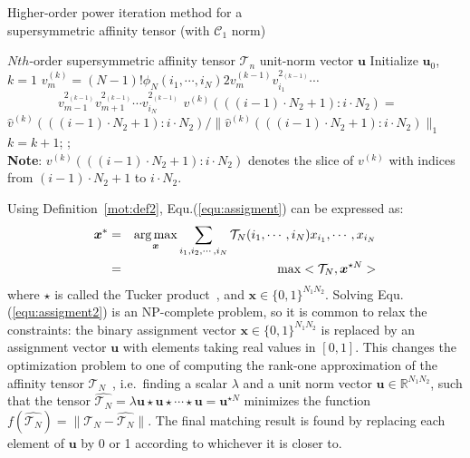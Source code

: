 \begin{algorithm}[!t]
\caption{\small Higher-order power iteration method for a \protect\\
         \mbox{}\hspace{15ex}\small supersymmetric affinity tensor (with $\mathcal{C}_1$ norm)}
\label{alg2}
\begin{algorithmic}[1]
\REQUIRE \small $Nth$-order supersymmetric affinity tensor $\mathcal{T}_n$
\ENSURE  \small unit-norm vector $\boldsymbol{u}$
\STATE   \small \; Initialize $\boldsymbol{u}_0$, $k=1$
\REPEAT
        \STATE $v_{m}^{(k)}=(N-1)!\phi_N(i_1,\cdots , i_N) 2v_{m}^{(k-1)}v_{i_1}^{2_{(k-1)}}\cdots$ \\
                 $\qquad \qquad v_{m-1}^{2_{(k-1)}}v_{m+1}^{2_{(k-1)}}\cdots v_{i_N}^{2_{(k-1)}}$
        \ENDFOR
        \STATE $v^{(k)}(((i-1)\cdot N_2+1) : i\cdot N_2)=$   \protect\\
               $\hat{v}^{(k)}(((i-1)\cdot N_2+1) : i\cdot N_2)/\lVert \hat{v}^{(k)}(((i-1)\cdot N_2+1):i\cdot N_2)\lVert_1$
        \ENDFOR
    \ENDFOR
    \STATE $k=k+1$;
;\protect\\
       \small \textbf{Note}: $v^{(k)}(((i-1)\cdot N_2+1) : i\cdot N_2)$ denotes the slice of $v^{(k)}$ with
       \small indices from $(i-1)\cdot N_2+1$ to $i\cdot N_2$.
\end{algorithmic}
\end{algorithm}

Using Definition~\ref{mot:def2}, Equ.(\ref{equ:assigment}) can be expressed as:
\begin{eqnarray}
\label{equ:assigment2}
{\boldsymbol{x}}^* &=& \operatorname*{arg\,max}_{\boldsymbol{x}} \sum_{i_1,i_2,\cdots,i_N} \mathcal{T}_N(i_1,\cdots,i_N) x_{i_1},\cdots,x_{i_N} \nonumber\\
&=& \max <\mathcal{T}_N, \boldsymbol{x}^{\star N}>
\end{eqnarray}
where $\star$ is called the Tucker product~\cite{Kofidis02}, and $\boldsymbol{x} \in \{0,1\}^{N_1N_2}$.
Solving Equ.(\ref{equ:assigment2}) is an NP-complete problem,
so it is common to relax the constraints:
the binary assignment vector $\boldsymbol{x}\in \{0,1\}^{N_1N_2}$ is replaced by an assignment vector $\boldsymbol{u}$ with elements taking real values in $[0,1]$.
This changes the optimization problem to one of computing the rank-one approximation of the affinity tensor $\mathcal{T}_N$~\cite{Kofidis02},
i.e.\ finding a scalar $\lambda$ and a unit norm vector $\boldsymbol{u}\in \mathbb{R}^{N_1N_2}$,
such that the tensor $\hat{\mathcal{T}_N} = \lambda \boldsymbol{u}\star \boldsymbol{u} \star\cdots \star \boldsymbol{u}=\boldsymbol{u}^{\star N}$ minimizes the function $f(\hat{\mathcal{T}_N})=\lVert \mathcal{T}_N-\hat{\mathcal{T}_N} \lVert$.
The final matching result is found by replacing each element of $\boldsymbol{u}$ by 0 or 1 according to whichever it is closer to.

